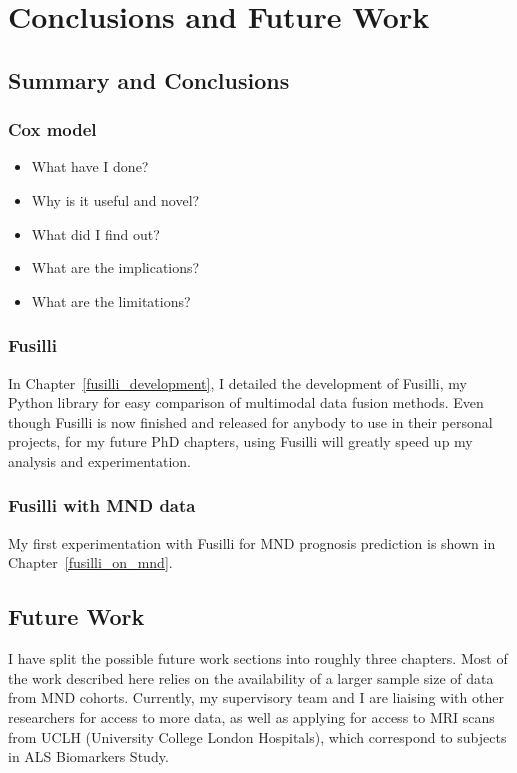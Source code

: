 \chapter{Conclusions and Future Work}
\label{conclusions_and_future_work}

\section{Summary and Conclusions}

\subsection{Cox model}
\begin{itemize}
    \item What have I done?
    \item Why is it useful and novel?
    \item What did I find out?
    \item What are the implications?
    \item What are the limitations?
\end{itemize}

\subsection{Fusilli}

In Chapter~\ref{fusilli_development}, I detailed the development of Fusilli, my Python library for easy comparison of multimodal data fusion methods.
Even though Fusilli is now finished and released for anybody to use in their personal projects, for my future PhD chapters, using Fusilli will greatly speed up my analysis and experimentation.

\subsection{Fusilli with MND data}

My first experimentation with Fusilli for MND prognosis prediction is shown in Chapter~\ref{fusilli_on_mnd}.

\section{Future Work}

I have split the possible future work sections into roughly three chapters.
Most of the work described here relies on the availability of a larger sample size of data from MND cohorts.
Currently, my supervisory team and I are liaising with other researchers for access to more data, as well as applying for access to MRI scans from UCLH (University College London Hospitals), which correspond to subjects in ALS Biomarkers Study.

